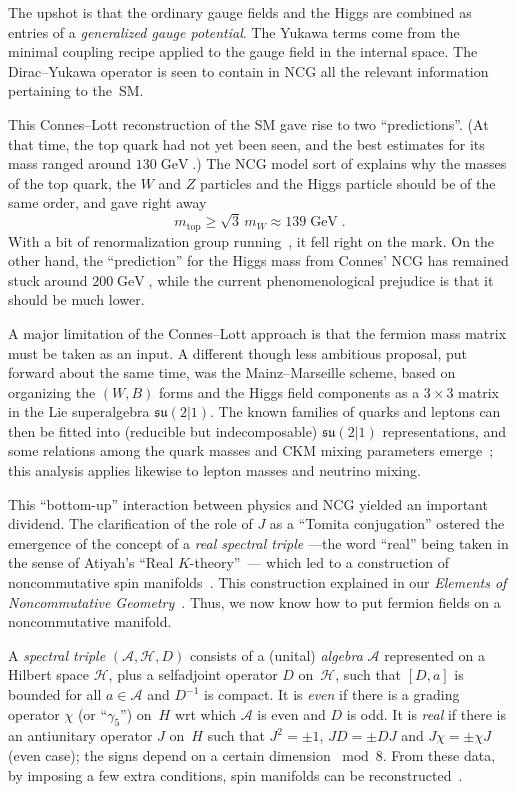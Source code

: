 \documentclass[a4paper,12pt]{article}
\newcommand{\A}{\mathcal{A}}        %
\newcommand{\ga}{\gamma}            %
\DeclareMathOperator{\GeV}{GeV}     %
\renewcommand{\H}{\mathcal{H}}      %
\newcommand{\sul}{\mathfrak{su}}    %
\def\top{\mathrm{top}}              %
\newcommand{\x}{\times}             %
\newcommand{\1}{\mathbf{1}}         %
\newcommand{\7}{\dagger}            %
\newcommand{\8}{\bullet}            %
\renewcommand{\.}{\cdot}            %
\renewcommand{\:}{\colon}           %
\begin{document}
The upshot is that the ordinary gauge fields and the Higgs are
combined as entries of a \textit{generalized gauge potential}. The
Yukawa terms come from the minimal coupling recipe applied to the
gauge field in the internal space. The Dirac--Yukawa operator is seen
to contain in NCG all the relevant information pertaining to the~SM.

This Connes--Lott reconstruction of the SM gave rise to two
``predictions''. (At that time, the top quark had not yet been seen,
and the best estimates for its mass ranged around $130 \GeV$.) The NCG
model sort of explains why the masses of the top quark, the $W$ and
$Z$ particles and the Higgs particle should be of the same order, and
gave right away
$$
m_\top \geq \sqrt{3}\, m_W \approx 139 \GeV.
$$
With a bit of renormalization group running~\cite{Orpheus}, it fell
right on the mark. On the other hand, the ``prediction'' for the Higgs
mass from Connes' NCG has remained stuck around $200 \GeV$, while the
current phenomenological prejudice is that it should be much lower.

A major limitation of the Connes--Lott approach is that the fermion
mass matrix must be taken as an input. A different though less
ambitious proposal, put forward about the same time, was the
Mainz--Marseille scheme, based on organizing the $(W,B)$ forms and the
Higgs field components as a $3 \x 3$ matrix in the Lie superalgebra
$\sul(2|1)$. The known families of quarks and leptons can then be
fitted into (reducible but indecomposable) $\sul(2|1)$
representations, and some relations among the quark masses and CKM mixing
parameters emerge~\cite{Scheck}; this analysis applies likewise to 
lepton masses and neutrino mixing.

\vspace{6pt}

This ``bottom-up'' interaction between physics and NCG yielded an
important dividend. The clarification of the role of $J$ as a ``Tomita
conjugation'' \cite{Takesaki} ostered the emergence of the concept of
a \textit{real spectral triple} ---the word ``real'' being taken in
the sense of Atiyah's ``Real $K$-theory''~\cite{AtiyahReal}--- which
led to a construction of noncommutative spin
manifolds~\cite{ConnesCours}. This construction explained in our
\textit{Elements of Noncommutative Geometry}~\cite{Polaris}. Thus, we
now know how to put fermion fields on a noncommutative manifold.

A \textit{spectral triple} $(\A,\H,D)$ consists of a (unital)
\textit{algebra} $\A$ represented on a Hilbert space $\H$, plus a
selfadjoint operator $D$ on~$\H$, such that $[D,a]$ is bounded for all
$a \in \A$ and $D^{-1}$ is compact. It is \textit{even} if there is a 
grading operator $\chi$ (or ``$\ga_5$'') on~$H$ wrt which $\A$ is even 
and $D$ is odd. It is \textit{real} if there is an antiunitary operator
$J$ on~$H$ such that $J^2 = \pm 1$, $JD = \pm DJ$ and
$J\chi = \pm\chi J$ (even case); the signs depend on a certain 
dimension $\bmod 8$. From these data, by imposing a few extra
conditions, spin manifolds can be reconstructed~\cite{ConnesGrav}.
\end{document}

